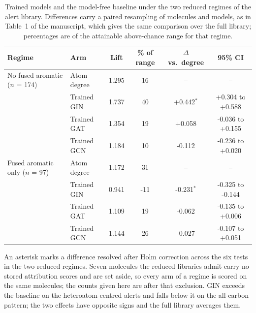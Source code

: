 \begin{table}[htbp]
\centering
\caption{Trained models and the model-free baseline under the two reduced regimes of the alert library. Differences carry a paired resampling of molecules and models, as in Table~1 of the manuscript, which gives the same comparison over the full library; percentages are of the attainable above-chance range for that regime.}
\label{tab:regime_trained}
\footnotesize
\setlength{\tabcolsep}{4pt}
\begin{tabular}{llcccc}
\toprule
Regime & Arm & Lift & \% of range & $\Delta$ vs.\ degree & 95\% CI \\
\midrule
No fused aromatic ($n$ = 174) & Atom degree & 1.295 & 16 & -- & -- \\
 & Trained GIN & 1.737 & 40 & +0.442$^{*}$ & +0.304 to +0.588 \\
 & Trained GAT & 1.354 & 19 & +0.058 & -0.036 to +0.155 \\
 & Trained GCN & 1.184 & 10 & -0.112 & -0.236 to +0.020 \\
Fused aromatic only ($n$ = 97) & Atom degree & 1.172 & 31 & -- & -- \\
 & Trained GIN & 0.941 & -11 & -0.231$^{*}$ & -0.325 to -0.144 \\
 & Trained GAT & 1.109 & 19 & -0.062 & -0.135 to +0.006 \\
 & Trained GCN & 1.144 & 26 & -0.027 & -0.107 to +0.051 \\
\bottomrule
\end{tabular}
\begin{flushleft}\footnotesize An asterisk marks a difference resolved after Holm correction across the six tests in the two reduced regimes. Seven molecules the reduced libraries admit carry no stored attribution scores and are set aside, so every arm of a regime is scored on the same molecules; the counts given here are after that exclusion. GIN exceeds the baseline on the heteroatom-centred alerts and falls below it on the all-carbon pattern; the two effects have opposite signs and the full library averages them.\end{flushleft}
\end{table}
